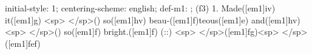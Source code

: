 initial-style: 1;
centering-scheme: english;
def-m1: \grealign;
(f3) 1. Made([em1]iv) it([em1]g) <sp> </sp>() so([em1]hv) beau-([em1]f)teous([em1]e) and([em1]hv) <sp> </sp>() so([em1]f) bright.([em1]f) (::) <sp> </sp>([em1]fg)<sp>   </sp>([em1]fef)
